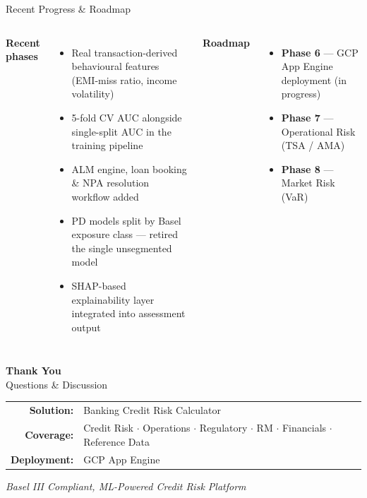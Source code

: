 \documentclass[9pt,aspectratio=169]{beamer}
\begin{document}
\begin{frame}{Recent Progress \& Roadmap}
\vspace{-2pt}
\begin{columns}[T]
    \textbf{Recent phases}
    \begin{itemize}\setlength\itemsep{4pt}
      \footnotesize
      \item[\small$\bullet$] Real transaction-derived behavioural features (EMI-miss ratio,
            income volatility)
      \item[\small$\bullet$] 5-fold CV AUC alongside single-split AUC in the training pipeline
      \item[\small$\bullet$] ALM engine, loan booking \& NPA resolution workflow added
      \item[\small$\bullet$] PD models split by Basel exposure class --- retired the single
            unsegmented model
      \item[\small$\bullet$] SHAP-based explainability layer integrated into assessment output
    \end{itemize}
    \textbf{Roadmap}
    \begin{itemize}\setlength\itemsep{4pt}
      \footnotesize
      \item[\small$\bullet$] \textbf{Phase 6} --- GCP App Engine deployment (in progress)
      \item[\small$\bullet$] \textbf{Phase 7} --- Operational Risk (TSA / AMA)
      \item[\small$\bullet$] \textbf{Phase 8} --- Market Risk (VaR)
    \end{itemize}
\end{columns}
\end{frame}

\begin{frame}
  \begin{center}
    \vspace{1.0cm}
    {\Large\bfseries Thank You}\\[8pt]
    {\normalsize Questions \& Discussion}

    \vspace{0.8cm}
    \footnotesize
    \begin{tabular}{rl}
      \textbf{Solution:}  & Banking Credit Risk Calculator\\
      \textbf{Coverage:}  & Credit Risk $\cdot$ Operations $\cdot$ Regulatory $\cdot$ RM $\cdot$ Financials $\cdot$ Reference Data\\
      \textbf{Deployment:} & GCP App Engine\\
    \end{tabular}

    \vspace{0.7cm}
    \small\textit{Basel III Compliant, ML-Powered Credit Risk Platform}
  \end{center}
\end{frame}
\end{document}
